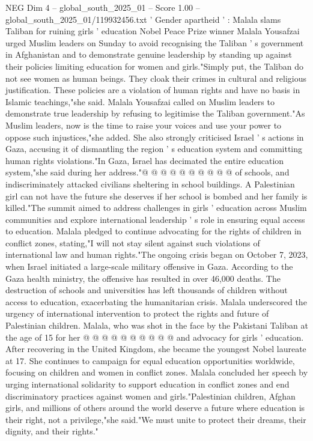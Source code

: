\begin{textsample}{NEG Dim 4 – global\_south\_2025\_01 – Score 1.00 – global\_south\_2025\_01/119932456.txt}  \label{ex:f4_neg_447}
' Gender apartheid ' : Malala slams Taliban for ruining girls ' education Nobel Peace Prize winner Malala Yousafzai urged Muslim leaders on Sunday to avoid recognising the Taliban ' s government in Afghanistan and to demonstrate genuine leadership by standing up against their policies limiting education for women and girls."Simply put, the Taliban do not see women as human beings.
They cloak their crimes in cultural and religious justification.
These policies are a violation of human rights and have no basis in Islamic teachings,"she said.
Malala Yousafzai called on Muslim leaders to demonstrate true leadership by refusing to legitimise the Taliban government."As Muslim leaders, now is the time to raise your voices and use your power to oppose such injustices,"she added.
She also strongly criticised Israel ' s actions in Gaza, accusing it of dismantling the region ' s education system and committing human rights violations."In Gaza, Israel has decimated the entire education system,"she said during her address."@ @ @ @ @ @ @ @ @ @ of schools, and indiscriminately attacked civilians sheltering in school buildings.
A Palestinian girl can not have the future she deserves if her school is bombed and her family is killed."The summit aimed to address challenges in girls ' education across Muslim communities and explore international leadership ' s role in ensuring equal access to education.
Malala pledged to continue advocating for the rights of children in conflict zones, stating,"I will not stay silent against such violations of international law and human rights."The ongoing crisis began on October 7, 2023, when Israel initiated a large-scale military offensive in Gaza.
According to the Gaza health ministry, the offensive has resulted in over 46,000 deaths.
The destruction of schools and universities has left thousands of children without access to education, exacerbating the humanitarian crisis.
Malala underscored the urgency of international intervention to protect the rights and future of Palestinian children.
Malala, who was shot in the face by the Pakistani Taliban at the age of 15 for her @ @ @ @ @ @ @ @ @ @ and advocacy for girls ' education.
After recovering in the United Kingdom, she became the youngest Nobel laureate at 17.
She continues to campaign for equal education opportunities worldwide, focusing on children and women in conflict zones.
Malala concluded her speech by urging international solidarity to support education in conflict zones and end discriminatory practices against women and girls."Palestinian children, Afghan girls, and millions of others around the world deserve a future where education is their right, not a privilege,"she said."We must unite to protect their dreams, their dignity, and their rights."

\end{textsample}
